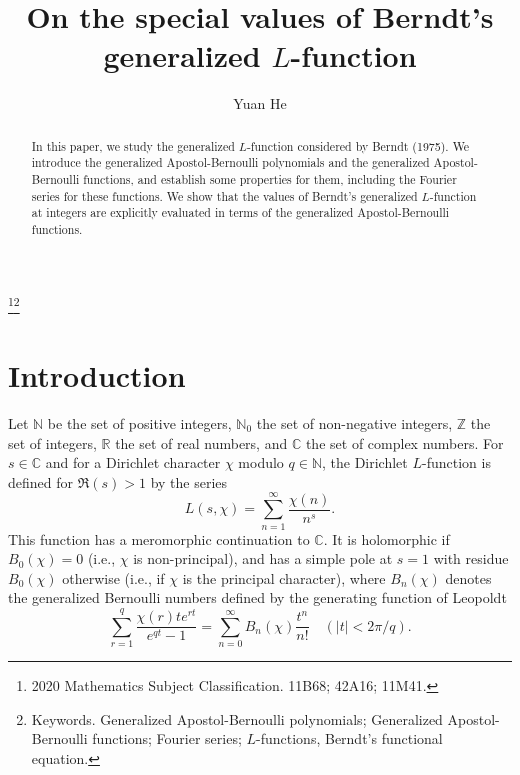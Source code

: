 \documentclass[reqno]{amsart}
\numberwithin{equation}{section}
\begin{document}
\setcounter{page}{1}

\title[generalized $L$-functions]{On the special values of Berndt's generalized $L$-function}
\thanks{2020 Mathematics Subject Classification. 11B68; 42A16; 11M41.}\thanks{Keywords. Generalized Apostol-Bernoulli polynomials; Generalized Apostol-Bernoulli functions; Fourier series; $L$-functions, Berndt's functional equation.}
\author{Yuan He}
\address{School of Mathematics and Big Data, Neijiang Normal University, Neijiang 641100, Sichuan, People's Republic of China}

\begin{abstract}
In this paper, we study the generalized $L$-function considered by Berndt (1975). We introduce the generalized Apostol-Bernoulli polynomials and the generalized Apostol-Bernoulli functions, and establish some properties for them, including the Fourier series for these functions. We show that the values of Berndt's generalized $L$-function at integers are explicitly evaluated in terms of the generalized Apostol-Bernoulli functions.
\end{abstract}

\maketitle

\section{Introduction}\label{sec1}

Let $\mathbb{N}$ be the set of positive integers, $\mathbb{N}_{0}$ the set of non-negative integers, $\mathbb{Z}$ the set of integers, $\mathbb{R}$ the set of real numbers, and $\mathbb{C}$ the set of complex numbers. For $s\in\mathbb{C}$ and for a Dirichlet character $\chi$ modulo $q\in\mathbb{N}$, the Dirichlet
$L$-function is defined for $\Re(s)>1$ by the series
\begin{equation}\label{eq1.1}
L(s,\chi)=\sum_{n=1}^{\infty}\frac{\chi(n)}{n^{s}}.
\end{equation}
This function has a meromorphic continuation to $\mathbb{C}$. It is holomorphic if $B_{0}(\chi)=0$
(i.e., $\chi$ is non-principal), and has a simple pole at $s=1$ with residue $B_{0}(\chi)$
otherwise (i.e., if $\chi$ is the principal character), where $B_{n}(\chi)$ denotes the generalized Bernoulli numbers defined by the generating function of Leopoldt \cite{leopoldt}
\begin{equation}\label{eq1.2}
\sum_{r=1}^{q}\frac{\chi(r)te^{rt}}{e^{qt}-1}=\sum_{n=0}^{\infty}B_{n}(\chi)\frac{t^{n}}{n!}\quad(|t|<2\pi/q).
\end{equation}
\end{document}
